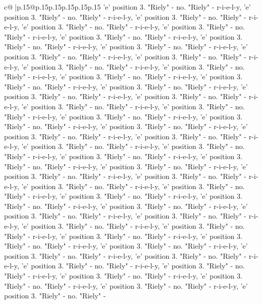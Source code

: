 \documentclass{article}
\begin{document}
{\begin{supertabular}{c@{$\;$}|p{.15\linewidth}@{}p{.15\linewidth}p{.15\linewidth}p{.15\linewidth}p{.15\linewidth}p{.15\linewidth}}
{{{'e' position 3. "Riely" {-} no. "Riely" {-} r{-}i{-}e{-}l{-}y, 'e' position 3. "Riely" {-} no. "Riely" {-} r{-}i{-}e{-}l{-}y, 'e' position 3. "Riely" {-} no. "Riely" {-} r{-}i{-}e{-}l{-}y, 'e' position 3. "Riely" {-} no. "Riely" {-} r{-}i{-}e{-}l{-}y, 'e' position 3. "Riely" {-} no. "Riely" {-} r{-}i{-}e{-}l{-}y, 'e' position 3. "Riely" {-} no. "Riely" {-} r{-}i{-}e{-}l{-}y, 'e' position 3. "Riely" {-} no. "Riely" {-} r{-}i{-}e{-}l{-}y, 'e' position 3. "Riely" {-} no. "Riely" {-} r{-}i{-}e{-}l{-}y, 'e' position 3. "Riely" {-} no. "Riely" {-} r{-}i{-}e{-}l{-}y, 'e' position 3. "Riely" {-} no. "Riely" {-} r{-}i{-}e{-}l{-}y, 'e' position 3. "Riely" {-} no. "Riely" {-} r{-}i{-}e{-}l{-}y, 'e' position 3. "Riely" {-} no. "Riely" {-} r{-}i{-}e{-}l{-}y, 'e' position 3. "Riely" {-} no. "Riely" {-} r{-}i{-}e{-}l{-}y, 'e' position 3. "Riely" {-} no. "Riely" {-} r{-}i{-}e{-}l{-}y, 'e' position 3. "Riely" {-} no. "Riely" {-} r{-}i{-}e{-}l{-}y, 'e' position 3. "Riely" {-} no. "Riely" {-} r{-}i{-}e{-}l{-}y, 'e' position 3. "Riely" {-} no. "Riely" {-} r{-}i{-}e{-}l{-}y, 'e' position 3. "Riely" {-} no. "Riely" {-} r{-}i{-}e{-}l{-}y, 'e' position 3. "Riely" {-} no. "Riely" {-} r{-}i{-}e{-}l{-}y, 'e' position 3. "Riely" {-} no. "Riely" {-} r{-}i{-}e{-}l{-}y, 'e' position 3. "Riely" {-} no. "Riely" {-} r{-}i{-}e{-}l{-}y, 'e' position 3. "Riely" {-} no. "Riely" {-} r{-}i{-}e{-}l{-}y, 'e' position 3. "Riely" {-} no. "Riely" {-} r{-}i{-}e{-}l{-}y, 'e' position 3. "Riely" {-} no. "Riely" {-} r{-}i{-}e{-}l{-}y, 'e' position 3. "Riely" {-} no. "Riely" {-} r{-}i{-}e{-}l{-}y, 'e' position 3. "Riely" {-} no. "Riely" {-} r{-}i{-}e{-}l{-}y, 'e' position 3. "Riely" {-} no. "Riely" {-} r{-}i{-}e{-}l{-}y, 'e' position 3. "Riely" {-} no. "Riely" {-} r{-}i{-}e{-}l{-}y, 'e' position 3. "Riely" {-} no. "Riely" {-} r{-}i{-}e{-}l{-}y, 'e' position 3. "Riely" {-} no. "Riely" {-} r{-}i{-}e{-}l{-}y, 'e' position 3. "Riely" {-} no. "Riely" {-} r{-}i{-}e{-}l{-}y, 'e' position 3. "Riely" {-} no. "Riely" {-} r{-}i{-}e{-}l{-}y, 'e' position 3. "Riely" {-} no. "Riely" {-} r{-}i{-}e{-}l{-}y, 'e' position 3. "Riely" {-} no. "Riely" {-} r{-}i{-}e{-}l{-}y, 'e' position 3. "Riely" {-} no. "Riely" {-} r{-}i{-}e{-}l{-}y, 'e' position 3. "Riely" {-} no. "Riely" {-} r{-}i{-}e{-}l{-}y, 'e' position 3. "Riely" {-} no. "Riely" {-} r{-}i{-}e{-}l{-}y, 'e' position 3. "Riely" {-} no. "Riely" {-} r{-}i{-}e{-}l{-}y, 'e' position 3. "Riely" {-} no. "Riely" {-} r{-}i{-}e{-}l{-}y, 'e' position 3. "Riely" {-} no. "Riely" {-} r{-}i{-}e{-}l{-}y, 'e' position 3. "Riely" {-} no. "Riely" {-} r{-}i{-}e{-}l{-}y, 'e' position 3. "Riely" {-} no. "Riely" {-} r{-}i{-}e{-}l{-}y, 'e' position 3. "Riely" {-} no. "Riely" {-} r{-}i{-}e{-}l{-}y, 'e' position 3. "Riely" {-} no. "Riely" {-} r{-}i{-}e{-}l{-}y, 'e' position 3. "Riely" {-} no. "Riely" {-} r{-}i{-}e{-}l{-}y, 'e' position 3. "Riely" {-} no. "Riely" {-} r{-}i{-}e{-}l{-}y, 'e' position 3. "Riely" {-} no. "Riely" {-} r{-}i{-}e{-}l{-}y, 'e' position 3. "Riely" {-} no. "Riely" {-} r{-}i{-}e{-}l{-}y, 'e' position 3. "Riely" {-} no. "Riely" {-} r{-}i{-}e{-}l{-}y, 'e' position 3. "Riely" {-} no. "Riely" {-} r{-}i{-}e{-}l{-}y, 'e' position 3. "Riely" {-} no. "Riely" {-} }}}
\end{supertabular}}
\end{document}
